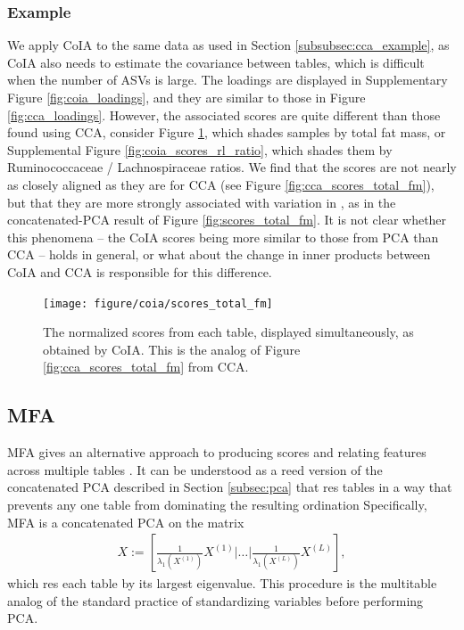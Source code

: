 \documentclass{article}
\begin{document}
\subsubsection{Example}
\label{subsubsec:coia_example}

We apply CoIA to the same data as used in Section \ref{subsubsec:cca_example},
as CoIA also needs to estimate the covariance between tables, which is difficult
when the number of ASVs is large. The loadings are displayed in Supplementary
Figure \ref{fig:coia_loadings}, and they are similar to those in Figure
\ref{fig:cca_loadings}. However, the associated scores are quite
different than those found using CCA, consider Figure
\ref{fig:coia_scores_total_fm}, which shades samples by total fat mass, or
Supplemental Figure \ref{fig:coia_scores_rl_ratio}, which shades them by
Ruminococcaceae / Lachnospiraceae ratios. We find that the scores are not nearly as
closely aligned as they are for CCA (see Figure \ref{fig:cca_scores_total_fm}), but
that they are more strongly associated with variation in , as in the
concatenated-PCA result of Figure \ref{fig:scores_total_fm}. It is not
clear whether this phenomena -- the CoIA scores being more similar to those from
PCA than CCA -- holds in general, or what about the change in inner products
between CoIA and CCA is responsible for this difference.

\begin{figure}[ht]
  \centering
  \texttt{[image: figure/coia/scores\_total\_fm]}
  \caption{The normalized scores from each table, displayed
    simultaneously, as obtained by CoIA. This is the analog of Figure
    \ref{fig:cca_scores_total_fm} from CCA. \label{fig:coia_scores_total_fm} }
\end{figure}


\subsection{MFA}
\label{subsec:mfa}

MFA gives an alternative approach to producing scores and relating features
across multiple tables \citep{pages2014multiple}. It can be understood as a
reed version of the concatenated PCA described in Section \ref{subsec:pca}
that res tables in a way that prevents any one table from dominating the
resulting ordination Specifically, MFA is a concatenated PCA on the matrix
\begin{align*}
X := \left[\frac{1}{\lambda_{1}\left(X^{(1)}\right)}X^{(1)} \vert \dots
  \vert \frac{1}{\lambda_{1}\left(X^{(L)}\right)}X^{(L)}\right],
\end{align*}
which res each table by its largest eigenvalue. This procedure is the
multitable analog of the standard practice of standardizing variables before
performing PCA.
\end{document}
